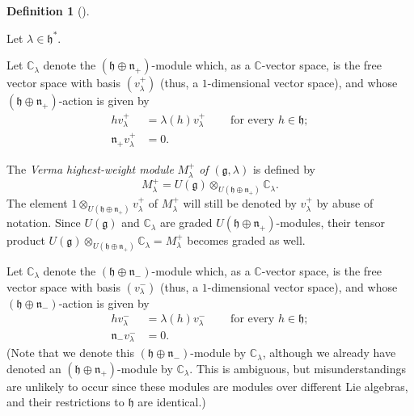 \documentclass
[numbers=enddot,12pt,final,onecolumn,german,notitlepage]{scrartcl}%
\theoremstyle{definition}
\newtheorem{defi}[theo]{Definition}
\newenvironment{definition}[1][]
{\begin{defi}[#1]\begin{leftbar}}
{\end{leftbar}\end{defi}}
\begin{document}
\begin{definition}
\label{def.verma}Let $\lambda\in\mathfrak{h}^{\ast}$.

Let $\mathbb{C}_{\lambda}$ denote the $\left(  \mathfrak{h}\oplus
\mathfrak{n}_{+}\right)  $-module which, as a $\mathbb{C}$-vector space, is
the free vector space with basis $\left(  v_{\lambda}^{+}\right)  $ (thus, a
$1$-dimensional vector space), and whose $\left(  \mathfrak{h}\oplus
\mathfrak{n}_{+}\right)  $-action is given by%
\begin{align*}
hv_{\lambda}^{+}  &  =\lambda\left(  h\right)  v_{\lambda}^{+}%
\ \ \ \ \ \ \ \ \ \ \text{for every }h\in\mathfrak{h};\\
\mathfrak{n}_{+}v_{\lambda}^{+}  &  =0.
\end{align*}


The \textit{Verma highest-weight module }$M_{\lambda}^{+}$ \textit{of
}$\left(  \mathfrak{g},\lambda\right)  $ is defined by%
\[
M_{\lambda}^{+}=U\left(  \mathfrak{g}\right)  \otimes_{U\left(  \mathfrak{h}%
\oplus\mathfrak{n}_{+}\right)  }\mathbb{C}_{\lambda}.
\]
The element $1\otimes_{U\left(  \mathfrak{h}\oplus\mathfrak{n}_{+}\right)
}v_{\lambda}^{+}$ of $M_{\lambda}^{+}$ will still be denoted by $v_{\lambda
}^{+}$ by abuse of notation. Since $U\left(  \mathfrak{g}\right)  $ and
$\mathbb{C}_{\lambda}$ are graded $U\left(  \mathfrak{h}\oplus\mathfrak{n}%
_{+}\right)  $-modules, their tensor product $U\left(  \mathfrak{g}\right)
\otimes_{U\left(  \mathfrak{h}\oplus\mathfrak{n}_{+}\right)  }\mathbb{C}%
_{\lambda}=M_{\lambda}^{+}$ becomes graded as well.

Let $\mathbb{C}_{\lambda}$ denote the $\left(  \mathfrak{h}\oplus
\mathfrak{n}_{-}\right)  $-module which, as a $\mathbb{C}$-vector space, is
the free vector space with basis $\left(  v_{\lambda}^{-}\right)  $ (thus, a
$1$-dimensional vector space), and whose $\left(  \mathfrak{h}\oplus
\mathfrak{n}_{-}\right)  $-action is given by%
\begin{align*}
hv_{\lambda}^{-}  &  =\lambda\left(  h\right)  v_{\lambda}^{-}%
\ \ \ \ \ \ \ \ \ \ \text{for every }h\in\mathfrak{h};\\
\mathfrak{n}_{-}v_{\lambda}^{-}  &  =0.
\end{align*}
(Note that we denote this $\left(  \mathfrak{h}\oplus\mathfrak{n}_{-}\right)
$-module by $\mathbb{C}_{\lambda}$, although we already have denoted an
$\left(  \mathfrak{h}\oplus\mathfrak{n}_{+}\right)  $-module by $\mathbb{C}%
_{\lambda}$. This is ambiguous, but misunderstandings are unlikely to occur
since these modules are modules over different Lie algebras, and their
restrictions to $\mathfrak{h}$ are identical.)


\end{definition}
\end{document}
